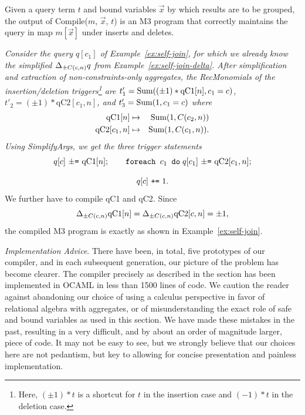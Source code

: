 \begin{theorem}
Given a query term $t$ and bound variables $\vec{x}$ by which results
are to be grouped,
the output of Compile($m$, $\vec{x}$, $t$) is an M3 program that
correctly maintains the query in map $m[\vec{x}]$ under inserts and deletes.
\end{theorem}



\begin{example}\em
\label{ex:self-join-compile}
Consider the query $q[c_1]$ of
Example~\ref{ex:self-join}, for which we already know
the simplified $\Delta_{\pm C(c,n)} q$ from Example~\ref{ex:self-join-delta}.
After simplification and extraction of non-constraints-only aggregates,
the RecMonomials of the insertion/deletion triggers\footnote{Here,
$(\pm 1) * t$ is a shortcut for $t$ in the insertion case and
$(-1)*t$ in the deletion case.} are
$t'_1 = \mbox{Sum}((\pm 1) * \mbox{qC1}[n], c_1=c)$,
$t'_2 = (\pm 1) * \mbox{qC2}[c_1, n]$, and
$t'_3 = \mbox{Sum}(1, c_1=c)$
where
\begin{eqnarray*}
\mbox{qC1}[n] &\mapsto& \mbox{Sum}(1, C(c_2, n)) \\
\mbox{qC2}[c_1, n] &\mapsto& \mbox{Sum}(1, C(c_1,n)).
\end{eqnarray*}
Using SimplifyArgs, we get the three trigger statements
\[
q[c] \mbox{ {\tt $\pm$=} qC1}[n]; \quad\quad
\mbox{{\tt foreach $c_1$ do}} \; q[c_1] \mbox{ {\tt $\pm$=} qC2}[c_1, n];
\]

\vspace{-6mm}

\[
q[c] \mbox{ {\tt +=} } 1.
\]
We further have to compile qC1 and qC2. Since
\[
\Delta_{\pm C(c,n)} \mbox{qC1}[n] = \Delta_{\pm C(c,n)} \mbox{qC2}[c,n] = \pm 1,
\]
the compiled M3 program is exactly as shown in Example~\ref{ex:self-join}.
\punto
\end{example}


{\em Implementation Advice}.
There have been, in total, five prototypes of our compiler, and
in each subsequent generation, our picture of the problem has become clearer.
The compiler precisely as described in the section has been implemented
in OCAML in less than 1500 lines of code. We caution the reader against
abandoning our choice of using a calculus perspective
in favor of relational algebra with aggregates, or of misunderstanding
the exact role of safe and bound variables as used in this section.
We have made these mistakes in the past, resulting in 
a very difficult, and by about an order of magnitude larger, piece of code.
It may not be easy to see, but we strongly believe that
our choices here are not pedantism,
but key to allowing for concise presentation
and painless implementation.


